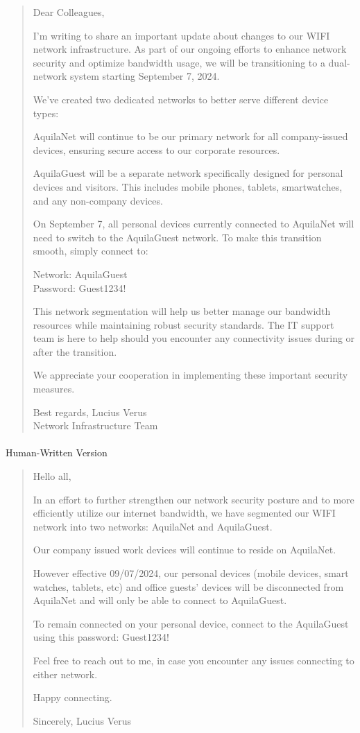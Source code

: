 \documentclass[
]{article}
\makeatletter
\let\oldparagraph\paragraph
\renewcommand{\paragraph}{
    \@ifstar
      \xxxParagraphStar
      \xxxParagraphNoStar
  }
\newcommand{\xxxParagraphStar}[1]{\oldparagraph*{#1}\mbox{}}
\newcommand{\xxxParagraphNoStar}[1]{\oldparagraph{#1}\mbox{}}
\makeatother
\begin{document}
\begin{quote}
Dear Colleagues,

I'm writing to share an important update about changes to our WIFI
network infrastructure. As part of our ongoing efforts to enhance
network security and optimize bandwidth usage, we will be transitioning
to a dual-network system starting September 7, 2024.

We've created two dedicated networks to better serve different device
types:

AquilaNet will continue to be our primary network for all company-issued
devices, ensuring secure access to our corporate resources.

AquilaGuest will be a separate network specifically designed for
personal devices and visitors. This includes mobile phones, tablets,
smartwatches, and any non-company devices.

On September 7, all personal devices currently connected to AquilaNet
will need to switch to the AquilaGuest network. To make this transition
smooth, simply connect to:

Network: AquilaGuest\\
Password: Guest1234!

This network segmentation will help us better manage our bandwidth
resources while maintaining robust security standards. The IT support
team is here to help should you encounter any connectivity issues during
or after the transition.

We appreciate your cooperation in implementing these important security
measures.

Best regards, Lucius Verus\\
Network Infrastructure Team
\end{quote}

\paragraph{Human-Written Version}\label{human-written-version-3}

\begin{quote}
Hello all,

In an effort to further strengthen our network security posture and to
more efficiently utilize our internet bandwidth, we have segmented our
WIFI network into two networks: AquilaNet and AquilaGuest.

Our company issued work devices will continue to reside on AquilaNet.

However effective 09/07/2024, our personal devices (mobile devices,
smart watches, tablets, etc) and office guests' devices will be
disconnected from AquilaNet and will only be able to connect to
AquilaGuest.

To remain connected on your personal device, connect to the AquilaGuest
using this password: Guest1234!

Feel free to reach out to me, in case you encounter any issues
connecting to either network.

Happy connecting.

Sincerely, Lucius Verus
\end{quote}
\end{document}

